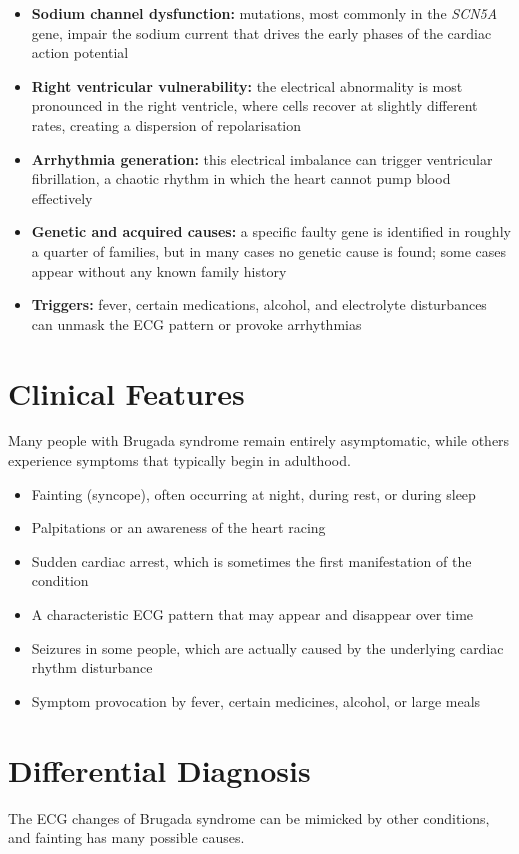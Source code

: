 \begin{itemize}
    \item \textbf{Sodium channel dysfunction:} mutations, most commonly in the \textit{SCN5A} gene, impair the sodium current that drives the early phases of the cardiac action potential
    \item \textbf{Right ventricular vulnerability:} the electrical abnormality is most pronounced in the right ventricle, where cells recover at slightly different rates, creating a dispersion of repolarisation
    \item \textbf{Arrhythmia generation:} this electrical imbalance can trigger ventricular fibrillation, a chaotic rhythm in which the heart cannot pump blood effectively
    \item \textbf{Genetic and acquired causes:} a specific faulty gene is identified in roughly a quarter of families, but in many cases no genetic cause is found; some cases appear without any known family history
    \item \textbf{Triggers:} fever, certain medications, alcohol, and electrolyte disturbances can unmask the ECG pattern or provoke arrhythmias
\end{itemize}

\section*{Clinical Features}
Many people with Brugada syndrome remain entirely asymptomatic, while others experience symptoms that typically begin in adulthood.

\begin{itemize}
    \item Fainting (syncope), often occurring at night, during rest, or during sleep
    \item Palpitations or an awareness of the heart racing
    \item Sudden cardiac arrest, which is sometimes the first manifestation of the condition
    \item A characteristic ECG pattern that may appear and disappear over time
    \item Seizures in some people, which are actually caused by the underlying cardiac rhythm disturbance
    \item Symptom provocation by fever, certain medicines, alcohol, or large meals
\end{itemize}

\section*{Differential Diagnosis}
The ECG changes of Brugada syndrome can be mimicked by other conditions, and fainting has many possible causes.


